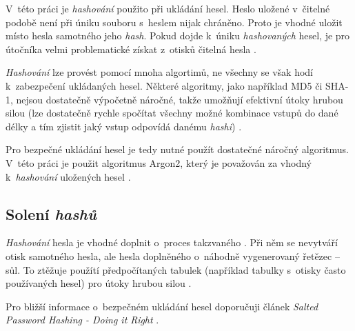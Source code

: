 V~této práci je \textit{hashování} použito při ukládání hesel. Heslo uložené v~čitelné podobě není při úniku souboru s~heslem nijak chráněno. Proto je vhodné uložit místo hesla samotného jeho \textit{hash}. Pokud dojde k~úniku \textit{hashovaných} hesel, je pro útočníka velmi problematické získat z~otisků čitelná hesla \cite{hash_crackstation}.

\textit{Hashování} lze provést pomocí mnoha algortimů, ne všechny se však hodí k~zabezpečení ukládaných hesel. Některé algoritmy, jako například MD5 či SHA-1, nejsou dostatečně výpočetně náročné, takže umožňují efektivní útoky hrubou silou (lze dostatečně rychle spočítat všechny možné kombinace vstupů do dané délky a tím zjistit jaký vstup odpovídá danému \textit{hashi}) \cite{hash_crackstation}. 

Pro bezpečné ukládání hesel je tedy nutné použít dostatečné náročný algoritmus. V~této práci je použit algoritmus Argon2, který je považován za vhodný k~\textit{hashování} uložených hesel \cite{hash_crackstation}.

\subsection{Solení \textit{hashů}}

\textit{Hashování} hesla je vhodné doplnit o~proces takzvaného . Při něm se nevytváří otisk samotného hesla, ale hesla doplněného o~náhodně vygenerovaný řetězec -- sůl. To ztěžuje použítí předpočítaných tabulek (například tabulky s~otisky často používaných hesel) pro útoky hrubou silou \cite{hash_crackstation}.

Pro bližší informace o~bezpečném ukládání hesel doporučuji článek \textit{Salted Password Hashing - Doing it Right} \cite{hash_crackstation}.
